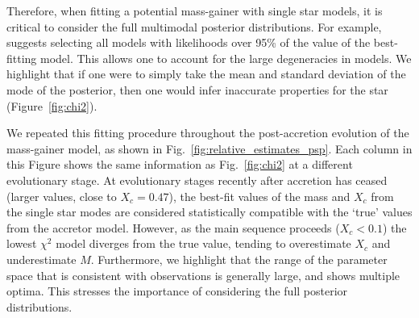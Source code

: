 \documentclass[twocolumn, twocolappendix, oneside]{aastex631}
\makeatletter
\newcommand{\unit}[1]{%
    \,\mathrm{#1}\checknextarg}
\newcommand{\checknextarg}{\@ifnextchar\bgroup{\gobblenextarg}{}}
\newcommand{\gobblenextarg}[1]{\,\mathrm{#1}\@ifnextchar\bgroup{\gobblenextarg}{}}
\newif\ifstartedinmathmode
\newcommand{\msun}{%
  \relax\ifmmode\startedinmathmodetrue\else\startedinmathmodefalse\fi
  {\ifstartedinmathmode\unit{M_{\odot}}\else$\unit{M_{\odot}}$\fi}\xspace%
}
\newif\ifstartedinmathmode
\makeatother
\begin{document}
Therefore, when fitting a potential mass-gainer with single star models, it is critical to consider the full multimodal posterior distributions. For example, \citealt{Basu+2012:2012ApJ...746...76B} suggests selecting all models with likelihoods over
95\% of the value of the best-fitting model. This allows one to account for the large degeneracies in models. We highlight that if one were to simply take the mean and standard deviation of the mode of the posterior, then one would infer inaccurate properties for the star (Figure~\ref{fig:chi2}).


We repeated this fitting procedure throughout the post-accretion evolution of the mass-gainer model, as shown in Fig.~\ref{fig:relative_estimates_psp}. Each column in this Figure shows the same information as Fig.~\ref{fig:chi2} at a different evolutionary stage. At evolutionary stages recently after accretion has ceased (larger values, close to $X_c = 0.47$), the best-fit values of the mass and $X_c$ from the single star modes are considered statistically compatible with the `true' values from the accretor model. However, as the main sequence proceeds ($X_c < 0.1$) the lowest $\chi^2$ model diverges from the true value, tending to overestimate $X_c$ and underestimate $M$. Furthermore, we highlight that the range of the parameter space that is consistent with observations is generally large, and shows multiple optima. This stresses the importance of considering the full posterior distributions.
\end{document}
